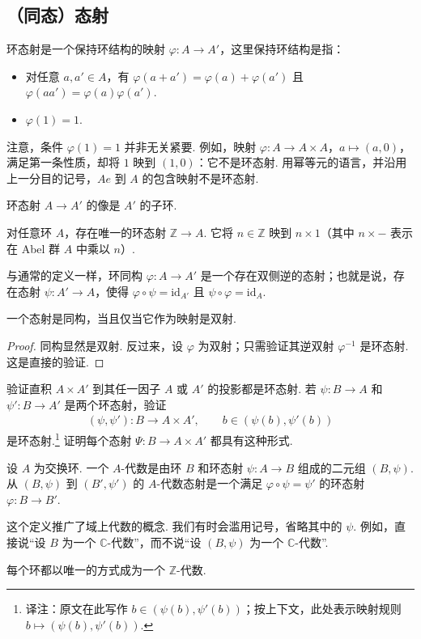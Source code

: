 \subsection{（同态）态射}\label{sec:galois-1-2-7}
环态射是一个保持环结构的映射 $\varphi:A\longrightarrow A'$，这里保持环结构是指：
\begin{itemize}
\item 对任意 $a,a'\in A$，有 $\varphi(a+a')=\varphi(a)+\varphi(a')$ 且 $\varphi(aa')=\varphi(a)\varphi(a')$.
\item $\varphi(1)=1$.
\end{itemize}
注意，条件 $\varphi(1)=1$ 并非无关紧要.
例如，映射 $\varphi:A\longrightarrow A\times A$，$a\longmapsto(a,0)$，满足第一条性质，却将 $1$ 映到 $(1,0)$：它不是环态射.
用幂等元的语言，并沿用上一分目的记号，$Ae$ 到 $A$ 的包含映射不是环态射.
\begin{remark*}
环态射 $A\longrightarrow A'$ 的像是 $A'$ 的子环.
\end{remark*}
\begin{remark*}
对任意环 $A$，存在唯一的环态射 $\mathbb Z\longrightarrow A$.
它将 $n\in\mathbb Z$ 映到 $n\times1$（其中 $n\times-$ 表示在 Abel 群 $A$ 中乘以 $n$）.
\end{remark*}
与通常的定义一样，环同构 $\varphi:A\longrightarrow A'$ 是一个存在双侧逆的态射；也就是说，存在态射 $\psi:A'\longrightarrow A$，使得 $\varphi\circ\psi=\mathrm{id}_{A'}$ 且 $\psi\circ\varphi=\mathrm{id}_A$.
\begin{lemma*}
一个态射是同构，当且仅当它作为映射是双射.
\end{lemma*}
\begin{proof}
同构显然是双射. 反过来，设 $\varphi$ 为双射；只需验证其逆双射 $\varphi^{-1}$ 是环态射. 这是直接的验证.
\end{proof}
\begin{exercise*}
验证直积 $A\times A'$ 到其任一因子 $A$ 或 $A'$ 的投影都是环态射.
若 $\psi:B\longrightarrow A$ 和 $\psi':B\longrightarrow A'$ 是两个环态射，验证
\begin{align*}
(\psi,\psi'):B\longrightarrow A\times A',\qquad b\in(\psi(b),\psi'(b))
\end{align*}
是环态射.\footnote{译注：原文在此写作 $b\in(\psi(b),\psi'(b))$；按上下文，此处表示映射规则 $b\mapsto(\psi(b),\psi'(b))$.}
证明每个态射 $\Psi:B\longrightarrow A\times A'$ 都具有这种形式.
\end{exercise*}
\begin{definition*}
设 $A$ 为交换环. 一个 $A$-代数是由环 $B$ 和环态射 $\psi:A\longrightarrow B$ 组成的二元组 $(B,\psi)$.
从 $(B,\psi)$ 到 $(B',\psi')$ 的 $A$-代数态射是一个满足 $\varphi\circ\psi=\psi'$ 的环态射 $\varphi:B\longrightarrow B'$.
\end{definition*}
\begin{remark*}
这个定义推广了域上代数的概念. 我们有时会滥用记号，省略其中的 $\psi$.
例如，直接说``设 $B$ 为一个 $\mathbb C$-代数''，而不说``设 $(B,\psi)$ 为一个 $\mathbb C$-代数''.
\end{remark*}
\begin{example*}
每个环都以唯一的方式成为一个 $\mathbb Z$-代数.
\end{example*}


